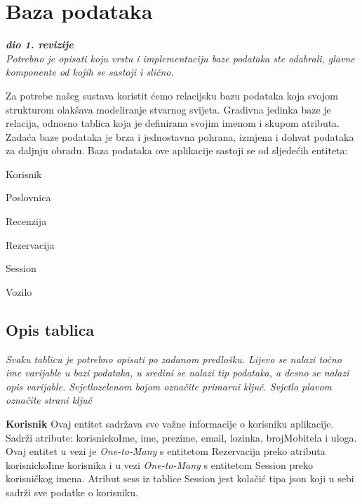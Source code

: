 	
		

		

				
		\section{Baza podataka}
			
			\textbf{\textit{dio 1. revizije}}\\
			
		\textit{Potrebno je opisati koju vrstu i implementaciju baze podataka ste odabrali, glavne komponente od kojih se sastoji i slično.}
		
		    \noindent Za potrebe našeg sustava koristit ćemo relacijsku bazu podataka koja
            svojom strukturom olakšava modeliranje stvarnog svijeta. Gradivna jedinka
            baze je relacija, odnosno tablica koja je definirana svojim imenom i 
            skupom atributa. Zadaća baze podataka je brza i jednostavna pohrana, 
            izmjena i dohvat podataka za daljnju obradu.
            Baza podataka ove aplikacije sastoji se od sljedećih entiteta:
            
            \begin{packed_item}
                \item Korisnik
                \item Poslovnica
                \item Recenzija
                \item Rezervacija
                \item Session
                \item Vozilo
            \end{packed_item}
		
			\subsection{Opis tablica}
			

				\textit{Svaku tablicu je potrebno opisati po zadanom predlošku. Lijevo se nalazi točno ime varijable u bazi podataka, u sredini se nalazi tip podataka, a desno se nalazi opis varijable. Svjetlozelenom bojom označite primarni ključ. Svjetlo plavom označite strani ključ} \newline
				
				
				\noindent \textbf{Korisnik} \quad Ovaj entitet sadržava sve važne informacije o korisniku aplikacije. Sadrži atribute: korisnickoIme, ime, prezime, email, lozinka, brojMobitela i uloga. Ovaj entitet u vezi je
                \textit{One-to-Many} s entitetom Rezervacija preko atributa korisnickoIme korisnika i u vezi \textit{One-to-Many} s entitetom Session preko korisničkog imena. Atribut sess iz tablice Session jest kolačić tipa json koji u sebi sadrži sve podatke o korisniku. 
                
